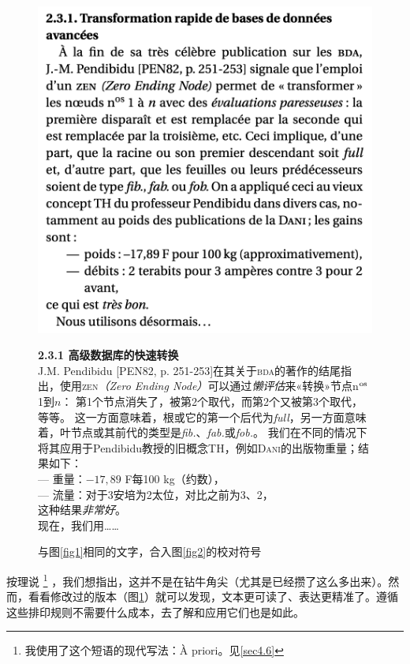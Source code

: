\begin{figure}
    \centering
    \includegraphics[width = \linewidth]{img/3.png}

\begin{mdframed}
    \footnotesize
    \textbf{2.3.1 \quad 高级数据库的快速转换}\\
    J.M. Pendibidu [PEN82, p. 251-253]在其关于\textsc{bda}的著作的结尾指出，使用\textsc{zen}\emph{（Zero Ending Node）}可以通过\emph{懒评估}来«转换»节点n$^{\rm os}$ 1到$n$：
    第1个节点消失了，被第2个取代，而第2个又被第3个取代，等等。
    这一方面意味着，根或它的第一个后代为\emph{full}，另一方面意味着，叶节点或其前代的类型是\emph{fib.}、\emph{fab.}或\emph{fob.}。
    我们在不同的情况下将其应用于Pendibidu教授的旧概念TH，例如\textsc{Dani}的出版物重量；结果如下：\\
    \mbox{\qquad} ---  重量：$-17,89$ F每100 kg（约数），\\
    \mbox{\qquad} ---  流量：对于3安培为2太位，对比之前为3、2，\\
    这种结果\emph{非常好}。\\
    现在，我们用……
\end{mdframed}

    \caption{与图\ref{fig1}相同的文字，合入图\ref{fig2}的校对符号}
    \label{fig3}
\end{figure}

按理说
    \footnote{我使用了这个短语的现代写法：À priori。见\ref{sec4.6}}
，我们想指出，这并不是在钻牛角尖（尤其是已经攒了这么多出来）。然而，看看修改过的版本（图\ref{fig3}）就可以发现，文本更可读了、表达更精准了。遵循这些排印规则不需要什么成本，去了解和应用它们也是如此。

